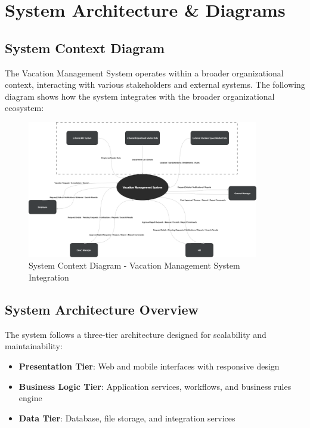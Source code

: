 \documentclass[12pt,a4paper]{article}
\begin{document}
\section{System Architecture \& Diagrams}

\subsection{System Context Diagram}
The Vacation Management System operates within a broader organizational context, interacting with various stakeholders and external systems. The following diagram shows how the system integrates with the broader organizational ecosystem:

\begin{figure}[H]
\centering
\includegraphics[width=0.9\textwidth]{Diagrams/Context/context.drawio.png}
\caption{System Context Diagram - Vacation Management System Integration}
\label{fig:context}
\end{figure}

\subsection{System Architecture Overview}
The system follows a three-tier architecture designed for scalability and maintainability:

\begin{itemize}
    \item \textbf{Presentation Tier}: Web and mobile interfaces with responsive design
    \item \textbf{Business Logic Tier}: Application services, workflows, and business rules engine
    \item \textbf{Data Tier}: Database, file storage, and integration services
\end{itemize}
\end{document}
